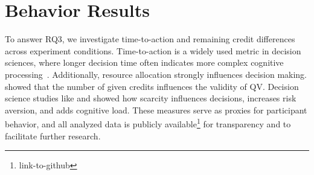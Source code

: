 \section{Behavior Results}
\label{sec:behave_result}
To answer RQ3, we investigate time-to-action and remaining credit differences across experiment conditions. Time-to-action is a widely used metric in decision sciences, where longer decision time often indicates more complex cognitive processing~\cite{payneAdaptiveDecisionMaker1993}. Additionally, resource allocation strongly influences decision making. \textcite{chengCanShowWhat2021} showed that the number of given credits influences the validity of QV. Decision science studies like \textcite{Shah2015a} and \cite{debruijnPovertyEconomicDecision2022} showed how scarcity influences decisions, increases risk aversion, and adds cognitive load. These measures serve as proxies for participant behavior, and all analyzed data is publicly available\footnote{link-to-github} for transparency and to facilitate further research.

\newsavebox{\savefig}

